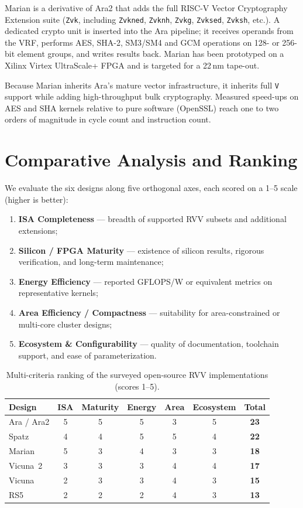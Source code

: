\documentclass[11pt,a4paper]{article}
\begin{document}
Marian is a derivative of Ara2 that adds the full RISC-V Vector Cryptography Extension suite (\texttt{Zvk}, including \texttt{Zvkned}, \texttt{Zvknh}, \texttt{Zvkg}, \texttt{Zvksed}, \texttt{Zvksh}, etc.). A dedicated crypto unit is inserted into the Ara pipeline; it receives operands from the VRF, performs AES, SHA-2, SM3/SM4 and GCM operations on 128- or 256-bit element groups, and writes results back. Marian has been prototyped on a Xilinx Virtex UltraScale+ FPGA and is targeted for a 22\,nm tape-out.

Because Marian inherits Ara's mature vector infrastructure, it inherits full \texttt{V} support while adding high-throughput bulk cryptography. Measured speed-ups on AES and SHA kernels relative to pure software (OpenSSL) reach one to two orders of magnitude in cycle count and instruction count.

\section{Comparative Analysis and Ranking}

We evaluate the six designs along five orthogonal axes, each scored on a 1--5 scale (higher is better):

\begin{enumerate}
  \item \textbf{ISA Completeness} --- breadth of supported RVV subsets and additional extensions;
  \item \textbf{Silicon / FPGA Maturity} --- existence of silicon results, rigorous verification, and long-term maintenance;
  \item \textbf{Energy Efficiency} --- reported GFLOPS/W or equivalent metrics on representative kernels;
  \item \textbf{Area Efficiency / Compactness} --- suitability for area-constrained or multi-core cluster designs;
  \item \textbf{Ecosystem \& Configurability} --- quality of documentation, toolchain support, and ease of parameterization.
\end{enumerate}

\begin{table}[htbp]
\centering
\caption{Multi-criteria ranking of the surveyed open-source RVV implementations (scores 1--5).}
\label{tab:ranking}
\begin{tabular}{@{}lccccc|c@{}}
\toprule
Design & ISA & Maturity & Energy & Area & Ecosystem & \textbf{Total} \\
\midrule
Ara / Ara2 & 5 & 5 & 5 & 3 & 5 & \textbf{23} \\
Spatz      & 4 & 4 & 5 & 5 & 4 & \textbf{22} \\
Marian     & 5 & 3 & 4 & 3 & 3 & \textbf{18} \\
Vicuna~2   & 3 & 3 & 3 & 4 & 4 & \textbf{17} \\
Vicuna     & 2 & 3 & 3 & 4 & 3 & \textbf{15} \\
RS5        & 2 & 2 & 2 & 4 & 3 & \textbf{13} \\
\bottomrule
\end{tabular}
\end{table}
\end{document}
